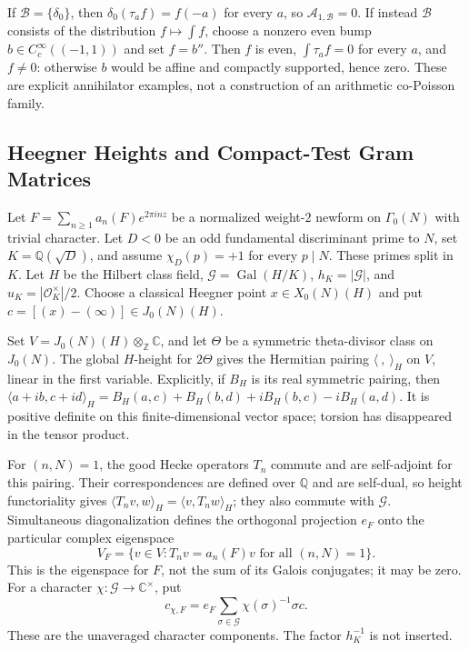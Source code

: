 \begin{example}
If $\mathcal B=\{\delta_0\}$, then
$\delta_0(\tau_a f)=f(-a)$ for every $a$, so
$\mathscr A_{1,\mathcal B}=0$.
If instead $\mathcal B$ consists of the distribution $f\mapsto\int f$,
choose a nonzero even bump $b\in C_c^\infty((-1,1))$ and set $f=b''$.
Then $f$ is even, $\int\tau_a f=0$ for every $a$, and $f\ne0$:
otherwise $b$ would be affine and compactly supported, hence zero.
These are explicit annihilator examples, not a construction of an
arithmetic co-Poisson family.
\end{example}

\subsection{Heegner Heights and Compact-Test Gram Matrices}
\label{v4-arith:w8-atp:new-closures:heeg}

Let $F=\sum_{n\geq1}a_n(F)e^{2\pi inz}$ be a normalized weight-$2$
newform on $\Gamma_0(N)$ with trivial character. Let $D<0$ be an odd
fundamental discriminant prime to $N$, set $K=\mathbb Q(\sqrt D)$,
and assume $\chi_D(p)=+1$ for every $p\mid N$. These primes split in $K$.
Let $H$ be the Hilbert class field, $\mathcal G=\operatorname{Gal}(H/K)$,
$h_K=|\mathcal G|$, and $u_K=|\mathcal O_K^\times|/2$.
Choose a classical Heegner point $x\in X_0(N)(H)$ and put
$c=[(x)-(\infty)]\in J_0(N)(H)$.

Set $V=J_0(N)(H)\otimes_{\mathbb Z}\mathbb C$, and let $\Theta$
be a symmetric theta-divisor class on $J_0(N)$.
The global $H$-height for $2\Theta$ gives the Hermitian pairing
$\langle\ ,\ \rangle_H$ on $V$, linear in the first variable.
Explicitly, if $B_H$ is its real symmetric pairing, then
$\langle a+ib,c+id\rangle_H
=B_H(a,c)+B_H(b,d)+iB_H(b,c)-iB_H(a,d)$.
It is positive definite on this finite-dimensional vector space;
torsion has disappeared in the tensor product.

For $(n,N)=1$, the good Hecke operators $T_n$ commute and are
self-adjoint for this pairing. Their correspondences are defined over
$\mathbb Q$ and are self-dual, so height functoriality gives
$\langle T_nv,w\rangle_H=\langle v,T_nw\rangle_H$; they also commute
with $\mathcal G$. Simultaneous diagonalization defines the orthogonal
projection $e_F$ onto the particular complex eigenspace
\[
 V_F=\{v\in V:T_nv=a_n(F)v\text{ for all }(n,N)=1\}.
\]
This is the eigenspace for $F$, not the sum of its Galois conjugates;
it may be zero. For a character $\chi:\mathcal G\to\mathbb C^\times$, put
\[
 c_{\chi,F}=e_F\sum_{\sigma\in\mathcal G}\chi(\sigma)^{-1}\sigma c.
\]
These are the unaveraged character components. The factor $h_K^{-1}$
is not inserted.

